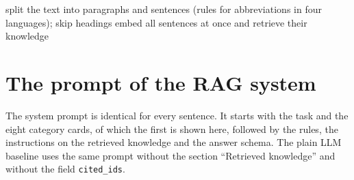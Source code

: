 \begin{algorithm}[H]
\caption{Document mode of the demo: model calls only where the gate could keep a category}
\label{alg:document}
\DontPrintSemicolon
{}
split the text into paragraphs and sentences (rules for abbreviations in four languages); skip headings\;
embed all sentences at once and retrieve their knowledge\;
\end{algorithm}


\section{The prompt of the RAG system}
\label{app:prompt}

The system prompt is identical for every sentence. It starts with the task and the eight category cards, of which the first is shown here, followed by the rules, the instructions on the retrieved knowledge and the answer schema. The plain LLM baseline uses the same prompt without the section ``Retrieved knowledge'' and without the field \texttt{cited\_ids}.


